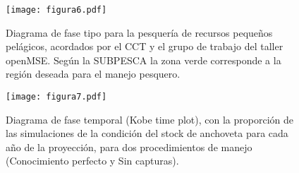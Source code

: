 
\begin{figure}[H]
    \centering
    \texttt{[image: figura6.pdf]}
    \caption{Diagrama de fase tipo para la pesquería de recursos pequeños pelágicos, acordados por el CCT y el grupo de trabajo del taller openMSE. Según la SUBPESCA la zona verde corresponde a la región deseada para el manejo pesquero.}
    \label{fig:figure6}
\end{figure}

\begin{figure}[H]
    \centering
    \texttt{[image: figura7.pdf]}
    \caption{Diagrama de fase temporal (Kobe time plot), con la proporción de las simulaciones de la condición del stock de anchoveta para cada año de la proyección, para dos procedimientos de manejo (Conocimiento perfecto y Sin capturas).}
    \label{fig:figure7}
\end{figure}